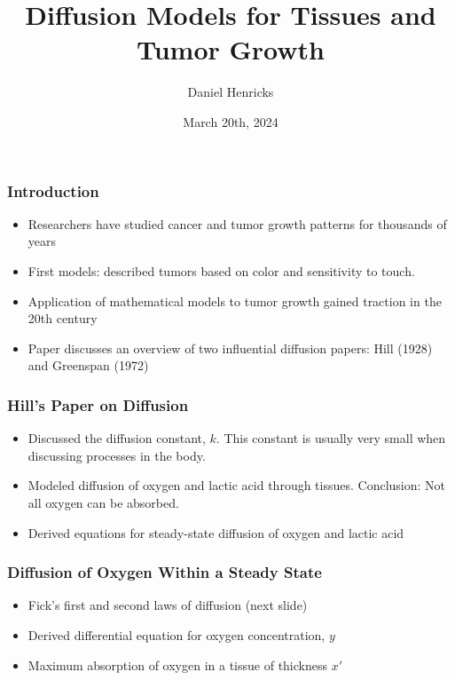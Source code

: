 \documentclass{beamer}
\begin{document}
\title[]{Diffusion Models for Tissues and Tumor Growth}
\author[Daniel Henricks]{Daniel Henricks
  \date{March 20th, 2024}
}


\begin{frame}
  \maketitle
\end{frame}
\begin{frame}
  \frametitle{Introduction}
  \begin{itemize}
    \item Researchers have studied cancer and tumor growth patterns for thousands of years
    \item First models: described tumors based on color and sensitivity to touch.
    \item Application of mathematical models to tumor growth gained traction in the 20th century
    \item Paper discusses an overview of two influential diffusion papers: Hill (1928) and Greenspan (1972)
  \end{itemize}
\end{frame}

\begin{frame}
  \frametitle{Hill's Paper on Diffusion}
  \begin{itemize}
    \item Discussed the diffusion constant, $k$. This constant is usually very small when discussing processes in the body.
    \item Modeled diffusion of oxygen and lactic acid through tissues. Conclusion: Not all oxygen can be absorbed.
    \item Derived equations for steady-state diffusion of oxygen and lactic acid
  \end{itemize}
\end{frame}

\begin{frame}
  \frametitle{Diffusion of Oxygen Within a Steady State}
  \begin{itemize}
    \item Fick's first and second laws of diffusion (next slide)
    \item Derived differential equation for oxygen concentration, $y$
    \item Maximum absorption of oxygen in a tissue of thickness $x'$
  \end{itemize}
\end{frame}
\end{document}
